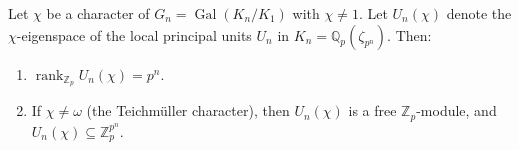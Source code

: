 Let $\chi$ be a character of $G_n = \operatorname{Gal}(K_n/K_1)$ with $\chi \neq 1$. Let $U_n(\chi)$ denote the $\chi$-eigenspace of the local principal units $U_n$ in $K_n = \mathbb{Q}_p(\zeta_{p^n})$. Then:
\begin{enumerate}
\item $\operatorname{rank}_{\mathbb{Z}_p} U_n(\chi) = p^n$.
\item If $\chi \neq \omega$ (the Teichm\"uller character), then $U_n(\chi)$ is a free $\mathbb{Z}_p$-module, and $U_n(\chi) \subseteq \mathbb{Z}_p^{p^n}$.
\end{enumerate}
